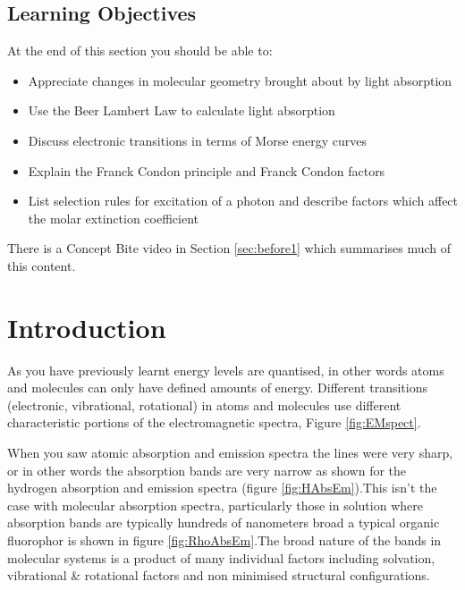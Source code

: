 \documentclass[
]{book}
\providecommand{\tightlist}{%
  \setlength{\itemsep}{0pt}\setlength{\parskip}{0pt}}
\begin{document}
\hypertarget{sec:AbsLOs}{%
\subsection{Learning Objectives}\label{sec:AbsLOs}}

At the end of this section you should be able to:

\begin{itemize}
\tightlist
\item
  Appreciate changes in molecular geometry brought about by light absorption
\item
  Use the Beer Lambert Law to calculate light absorption
\item
  Discuss electronic transitions in terms of Morse energy curves
\item
  Explain the Franck Condon principle and Franck Condon factors
\item
  List selection rules for excitation of a photon and describe factors which affect the molar extinction coefficient
\end{itemize}

There is a Concept Bite video in Section \ref{sec:before1} which summarises much of this content.

\hypertarget{sec:AbsIntro}{%
\section{Introduction}\label{sec:AbsIntro}}

As you have previously learnt energy levels are quantised, in other words atoms and molecules can only have defined amounts of energy. Different transitions (electronic, vibrational, rotational) in atoms and molecules use different characteristic portions of the electromagnetic spectra, Figure \ref{fig:EMspect}.

When you saw atomic absorption and emission spectra the lines were very sharp, or in other words the absorption bands are very narrow as shown for the hydrogen absorption and emission spectra (figure \ref{fig:HAbsEm}).This isn't the case with molecular absorption spectra, particularly those in solution where absorption bands are typically hundreds of nanometers broad a typical organic fluorophor is shown in figure \ref{fig:RhoAbsEm}.The broad nature of the bands in molecular systems is a product of many individual factors including solvation, vibrational \& rotational factors and non minimised structural configurations.
\end{document}

